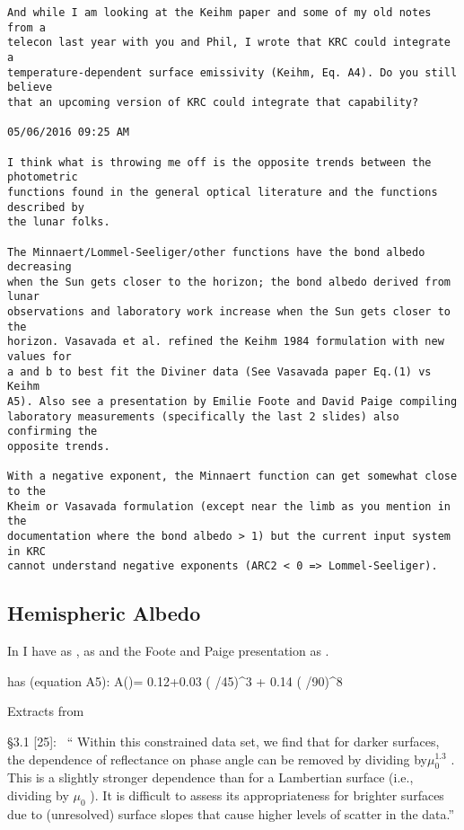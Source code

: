 \documentclass{article}
\begin{document}
\begin{verbatim}
And while I am looking at the Keihm paper and some of my old notes from a
telecon last year with you and Phil, I wrote that KRC could integrate a
temperature-dependent surface emissivity (Keihm, Eq. A4). Do you still believe
that an upcoming version of KRC could integrate that capability?

05/06/2016 09:25 AM

I think what is throwing me off is the opposite trends between the photometric
functions found in the general optical literature and the functions described by
the lunar folks.

The Minnaert/Lommel-Seeliger/other functions have the bond albedo decreasing
when the Sun gets closer to the horizon; the bond albedo derived from lunar
observations and laboratory work increase when the Sun gets closer to the
horizon. Vasavada et al. refined the Keihm 1984 formulation with new values for
a and b to best fit the Diviner data (See Vasavada paper Eq.(1) vs Keihm
A5). Also see a presentation by Emilie Foote and David Paige compiling
laboratory measurements (specifically the last 2 slides) also confirming the
opposite trends.

With a negative exponent, the Minnaert function can get somewhat close to the
Kheim or Vasavada formulation (except near the limb as you mention in the
documentation where the bond albedo > 1) but the current input system in KRC
cannot understand negative exponents (ARC2 < 0 => Lommel-Seeliger).

\end{verbatim} 

\subsection{Hemispheric Albedo}

In  I have  as , 
 as   
and the Foote and Paige presentation as  .

  has (equation A5): 
\qbn A(\theta)= 0.12+0.03 \left( \theta/45\right)^3 + 0.14 \left( \theta/90\right)^8 \qen

Extracts from 

 \S 3.1 [25]: \ `` Within this constrained data set, we find that for darker
 surfaces, the dependence of reflectance on phase angle can be removed by
 dividing by$\mu_0^{1.3}$ . This is a slightly stronger dependence than for a
 Lambertian surface (i.e., dividing by $\mu_0$ ). It is difficult to assess its
 appropriateness for brighter surfaces due to (unresolved) surface slopes that
 cause higher levels of scatter in the data.''
\end{document}
